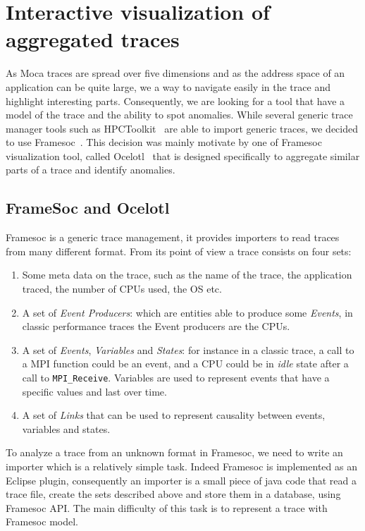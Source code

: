 \section{Interactive visualization of aggregated traces}
\label{sec:visu-first}

As \gls{Moca} traces are spread over five dimensions and as the address space of an application can be quite large, we a way to navigate easily in the trace and highlight interesting parts.
Consequently, we are looking for a tool that have a model of the trace and the ability to spot anomalies.
While several generic trace manager tools such as \gls{HPCToolkit}~\cite{Adhianto10HPCTOOLKIT} are able to import generic traces, we decided to use \gls{Framesoc}~\cite{Pagano14frameSoC}.
This decision was mainly motivate by one of \gls{Framesoc} visualization tool, called \gls{Ocelotl}~\cite{Dosimont14Ocelotl} that is designed specifically to aggregate similar parts of a trace and identify anomalies.

\subsection{FrameSoc and Ocelotl}

\gls{Framesoc} is a generic trace management, it provides importers to read traces from many different format.
From its point of view a trace consists on four sets:
\begin{enumerate}
    \item Some meta data on the trace, such as the name of the trace, the application traced, the number of \glspl{CPU} used, the \gls{OS} etc.
    \item A set of \emph{Event Producers}: which are entities able to produce some \emph{Events}, in classic performance traces the Event producers are the \glspl{CPU}.
    \item A set of \emph{Events}, \emph{Variables} and \emph{States}: for instance in a classic trace, a call to a \gls{MPI} function could be an event, and a \gls{CPU} could be in \emph{idle} state after a call to \texttt{MPI\_Receive}. Variables are used to represent events that have a specific values and last over time.
    \item A set of \emph{Links} that can be used to represent causality between events, variables and states.
\end{enumerate}

To analyze a trace from an unknown format in \gls{Framesoc}, we need to write an importer which is a relatively simple task.
Indeed \gls{Framesoc} is implemented as an Eclipse plugin, consequently an importer is a small piece of java code that read a trace file, create the sets described above and store them in a database, using \gls{Framesoc} \gls{API}.
The main difficulty of this task is to represent a trace with \gls{Framesoc} model.

